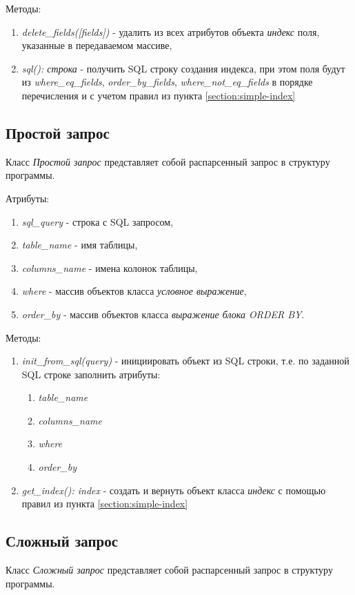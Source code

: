 Методы:
\begin{enumerate}
\item \textit{delete_fields([fields])} - удалить из всех атрибутов объекта \textit{индекс} поля, указанные в передаваемом массиве,
\item \textit{sql(): строка} - получить SQL строку создания индекса, при этом поля будут из \textit{where_eq_fields}, \textit{order_by_fields}, \textit{where_not_eq_fields} в порядке перечисления и с учетом правил из пункта \ref{section:simple-index} 
\end{enumerate}


\subsection{Простой запрос}
Класс \textit{Простой запрос} представляет собой распарсенный запрос в структуру программы.

Атрибуты:
\begin{enumerate}
\item \textit{sql_query} - строка с SQL запросом,
\item \textit{table_name} - имя таблицы,
\item \textit{columns_name} - имена колонок таблицы,
\item \textit{where} - массив объектов класса \textit{условное выражение},
\item \textit{order_by} - массив объектов класса \textit{выражение блока ORDER BY}.
\end{enumerate}

Методы:
\begin{enumerate}
\item \textit{init_from_sql(query)} - инициировать объект из SQL строки, т.е. по заданной SQL строке заполнить атрибуты: 
	\begin{enumerate}
	\item \textit{table_name} 
	\item \textit{columns_name}
	\item \textit{where}
	\item \textit{order_by}
	\end{enumerate}

\item \textit{get_index(): index} - создать и вернуть объект класса \textit{индекс} с помощью правил из пункта \ref{section:simple-index}
\end{enumerate}


\subsection{Сложный запрос}
Класс \textit{Сложный запрос} представляет собой распарсенный запрос в структуру программы.

